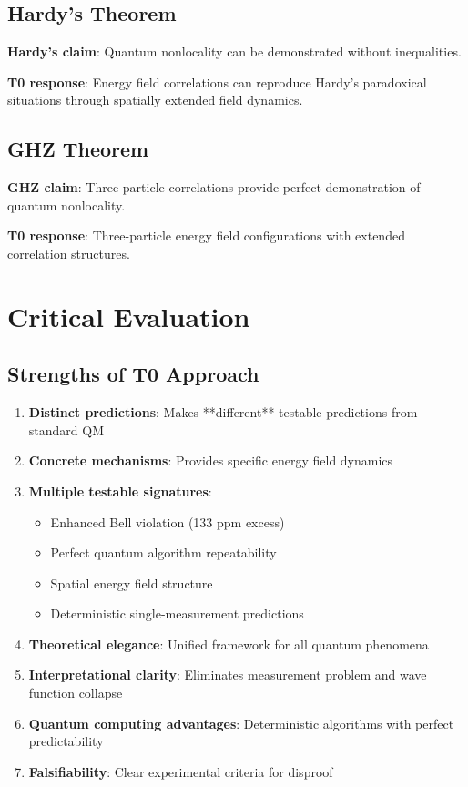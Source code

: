 	\subsection{Hardy's Theorem}
	
	\textbf{Hardy's claim}: Quantum nonlocality can be demonstrated without inequalities.
	
	\textbf{T0 response}: Energy field correlations can reproduce Hardy's paradoxical situations through spatially extended field dynamics.
	
	\subsection{GHZ Theorem}
	
	\textbf{GHZ claim}: Three-particle correlations provide perfect demonstration of quantum nonlocality.
	
	\textbf{T0 response}: Three-particle energy field configurations with extended correlation structures.
	
	\section{Critical Evaluation}
	
	\subsection{Strengths of T0 Approach}
	
	\begin{enumerate}
		\item \textbf{Distinct predictions}: Makes **different** testable predictions from standard QM
		\item \textbf{Concrete mechanisms}: Provides specific energy field dynamics
		\item \textbf{Multiple testable signatures}: 
		\begin{itemize}
			\item Enhanced Bell violation (133 ppm excess)
			\item Perfect quantum algorithm repeatability  
			\item Spatial energy field structure
			\item Deterministic single-measurement predictions
		\end{itemize}
		\item \textbf{Theoretical elegance}: Unified framework for all quantum phenomena
		\item \textbf{Interpretational clarity}: Eliminates measurement problem and wave function collapse
		\item \textbf{Quantum computing advantages}: Deterministic algorithms with perfect predictability
		\item \textbf{Falsifiability}: Clear experimental criteria for disproof
	\end{enumerate}
	
